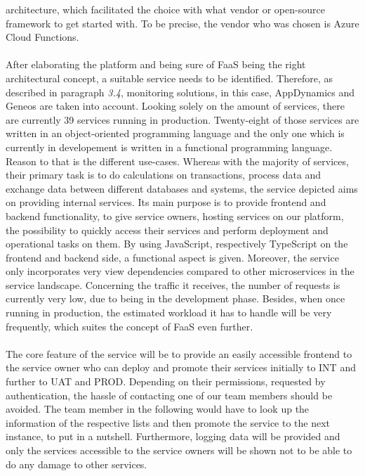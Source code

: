 \documentclass[a4paper,twoside,11pt, pagesize]{scrartcl}
\begin{document}
\begin{spacing}{1.2}
architecture, which facilitated the choice with what vendor or open-source framework to get started with. To be precise, the vendor who was chosen is Azure Cloud Functions.\\\\After elaborating the platform and being sure of FaaS being the right architectural concept, a suitable service needs to be identified. Therefore, as described in paragraph \textit{3.4}, monitoring solutions, in this case, AppDynamics and Geneos are taken into account. Looking solely on the amount of services, there are currently 39 services running in production. Twenty-eight of those services are written in an object-oriented programming language and the only one which is currently in developement is written in a functional programming language. Reason to that is the different use-cases. Whereas with the majority of services, their primary task is to do calculations on transactions, process data and exchange data between different databases and systems, the service depicted aims on providing internal services. Its main purpose is to provide frontend and backend functionality, to give service owners, hosting services on our platform, the possibility to quickly access their services and perform deployment and operational tasks on them. By using JavaScript, respectively TypeScript on the frontend and backend side, a functional aspect is given. Moreover, the service only incorporates very view dependencies compared to other microservices in the service landscape. Concerning the traffic it receives, the number of requests is currently very low, due to being in the development phase. Besides, when once running in production, the estimated workload it has to handle will be very frequently, which suites the concept of FaaS even further.\\\\The core feature of the service will be to provide an easily accessible frontend to the service owner who can deploy and promote their services initially to INT and further to UAT and PROD. Depending on their permissions, requested by authentication, the hassle of contacting one of our team members should be avoided. The team member in the following would have to look up the information of the respective lists and then promote the service to the next instance, to put in a nutshell. Furthermore, logging data will be provided and only the services accessible to the service owners will be shown not to be able to do any damage to other services.\\ 

\end{spacing}
\end{document}
